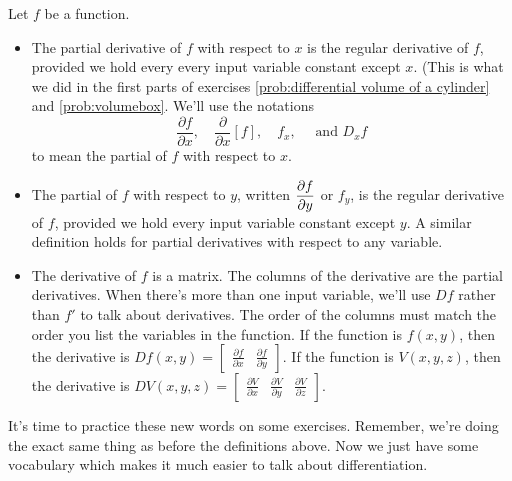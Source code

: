 \begin{definition}
 Let $f$ be a function. 
\begin{itemize}
 \item The partial derivative of $f$ with respect to $x$ is the regular derivative of $f$, provided we hold every every input variable constant except $x$. (This is what we did in the first parts of exercises \ref{prob:differential volume of a cylinder} and \ref{prob:volumebox}.  We'll use the notations
 $$
 \frac{\partial f}{\partial x}, 
 \quad \frac{\partial}{\partial x}[f],
 \quad f_x,
 \quad \text{ and }D_x f 
 $$
to mean the partial of $f$ with respect to $x$.
 \item The partial of $f$ with respect to $y$, written $\displaystyle \frac{\partial f}{\partial y}$ or $f_y$, is the regular derivative of $f$, provided we hold every input variable constant except $y$. A similar definition holds for partial derivatives with respect to any variable.
 \item The derivative of $f$ is a matrix. The columns of the derivative are the partial derivatives. When there's more than one input variable, we'll use $Df$ rather than $f'$ to talk about derivatives.  The order of the columns must match the order you list the variables in the function. If the function is $f(x,y)$, then the derivative is 
 $Df(x,y) = \begin{bmatrix}\frac{\partial f}{\partial x}&\frac{\partial f}{\partial y}\end{bmatrix}.$
 If the function is $V(x,y,z)$, then the derivative is 
 $DV(x,y,z) = \begin{bmatrix}\frac{\partial V}{\partial x}&\frac{\partial V}{\partial y}&\frac{\partial V}{\partial z}\end{bmatrix}.$
 
\end{itemize}
\end{definition}

It's time to practice these new words on some exercises.  Remember, we're doing the exact same thing as before the definitions above. Now we just have some vocabulary which makes it much easier to talk about differentiation.

